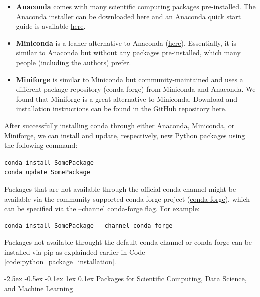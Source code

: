 \documentclass[12pt]{report}
\makeatletter
\renewcommand{\section}{\@startsection{section}{1}{\z@}%
  {-2.5ex \@plus -0.5ex \@minus -0.1ex}%
  {1ex \@plus 0.1ex}%
  {\normalfont\Large\sectionstyle}}
\newcommand{\sectionstyle}[1]{%
  \par\noindent\hrule
  \vspace{0.2ex}%
  {\scshape{#1}\par}%
  \vspace{0.4ex}%
  \hrule
}
\theoremstyle{largebreak}
\makeatother
\begin{document}
    \begin{itemize}
        \item \textbf{Anaconda} comes with many scientific computing packages pre-installed. The Anaconda installer can be downloaded \href{https://docs.anaconda.com/anaconda/install/,}{here} and an Anaconda quick start guide is available \href{https://docs.anaconda.com/anaconda/user-guide/getting-started/}{here}.

        \item \textbf{Miniconda} is a leaner alternative to Anaconda (\href{https://docs.conda.io/en/latest/miniconda.html}{here}). Essentially, it is similar to Anaconda but without any packages pre-installed, which many people (including the authors) prefer.

        \item \textbf{Miniforge} is similar to Miniconda but community-maintained and uses a different package repository (conda-forge) from Miniconda and Anaconda. We found that Miniforge is a great alternative to Miniconda. Download and installation instructions can be found in the GitHub repository \href{https://github.com/conda-forge/miniforge}{here}.
    \end{itemize}

    After successfully installing conda through either Anaconda, Miniconda, or Miniforge, we can install and update, respectively, new Python packages using the following command:

    \begin{lstlisting}[caption={Conda Package Installation.},label=code:conda_package_installation]
conda install SomePackage
conda update SomePackage
    \end{lstlisting}

    Packages that are not available through the official conda channel might be available via the community-supported conda-forge project (\href{https://conda-forge.org}{conda-forge}), which can be specified via the --channel conda-forge flag. For example:

    \begin{lstlisting}[caption={caption},label=DescriptiveLabel]
conda install SomePackage --channel conda-forge
    \end{lstlisting}

    Packages not available throught the default conda channel or conda-forge can be installed via pip as explainded earlier in Code \ref{code:python_package_installation}.

    \section{Packages for Scientific Computing, Data Science, and Machine Learning}
\end{document}
